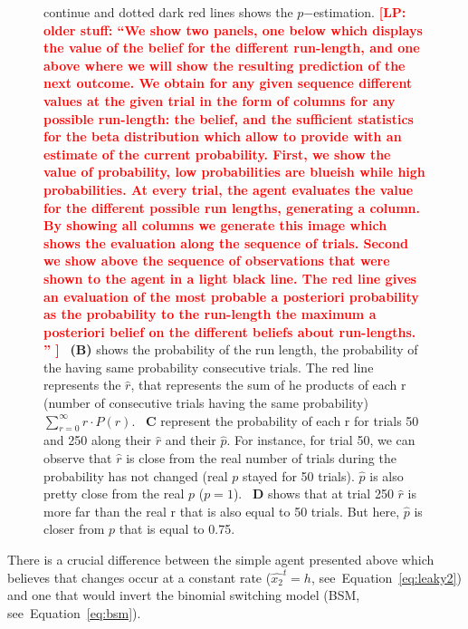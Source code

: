 \documentclass[12pt,english]{article}%
\newcommand{\seeEq}[1]{Equation~\ref{eq:#1}}
\newcommand{\LP}[1]{\textbf{\textcolor{red}{[LP: #1]}}}
\begin{document}
\begin{figure}
{continue and dotted dark red lines shows the $p$$-$estimation.
\LP{ older stuff: ``We show two panels, one below which displays
the value of the belief for the different run-length,
and one above where we will show the resulting prediction of the next outcome.
We obtain for any given sequence different values at the given trial
in the form of columns for any possible run-length:
the belief, and the sufficient statistics for the beta distribution
which allow to provide with an estimate of the current probability.
First, we show the value of probability,
low probabilities are blueish while high probabilities.
At every trial, the agent evaluates the value
for the different possible run lengths, generating a column.
By showing all columns we generate this image
which shows the evaluation along the sequence of trials.
Second we show above the sequence of observations
that were shown to the agent in a light black line.
The red line gives an evaluation of the most probable
a posteriori probability as the probability to the run-length
the maximum a posteriori belief on the different beliefs about run-lengths. ''
}
~\textbf{(B)} shows the probability of the run length,
the probability of the having same probability consecutive trials.
The red line represents the $\hat{r}$,
that represents the sum of he products of each r
(number of consecutive trials having the same probability)
$\sum_{r=0}^\infty r \cdot P(r)$.
~\textbf{C} represent the probability of each r for trials 50 and 250
along their $\hat{r}$ and their $\hat{p}$.
For instance, for trial 50, we can observe that $\hat{r}$ is close
from the real number of trials during the probability has not changed (real $p$ stayed for 50 trials).
$\hat{p}$ is also pretty close from the real $p$ ($p=1$).
~\textbf{D} shows that at trial 250 $\hat{r}$ is more far than the real r
that is also equal to 50 trials.
But here, $\hat{p}$ is closer from $p$ that is equal to 0.75.
}
\label{fig:bayesianchangepoint}
\end{figure}
There is a crucial difference between the simple agent presented above
which believes that changes occur at a constant rate ($\hat{x_2}^t=h$, see~\seeEq{leaky2})
and one that would invert the binomial switching model (BSM, see~\seeEq{bsm}).
\end{document}
